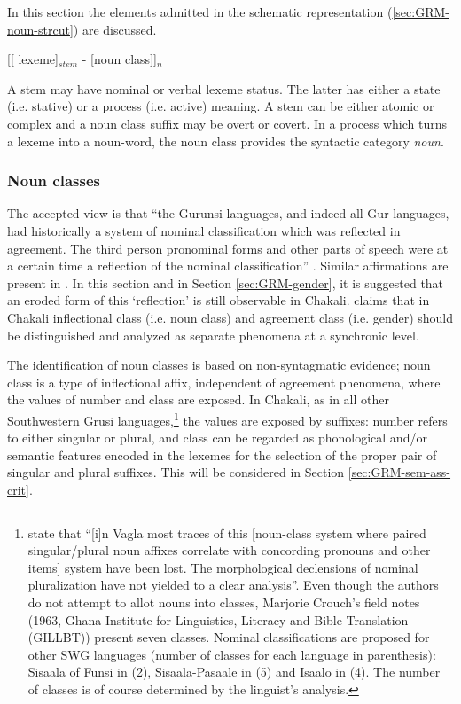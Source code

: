 \begin{exe}
\begin{exe}
\begin{exe}
{\begin{exe}
\begin{exe}
\begin{exe}
\begin{exe}
In this section the elements admitted in the
schematic representation (\ref{sec:GRM-noun-strcut}) are discussed.

\ea\label{sec:GRM-noun-strcut}
[[ {\sc lexeme}]$_{stem}$ - [{\sc noun class}]]$_{n}$
\z

A stem may have 
nominal or verbal lexeme status. The latter has either a state (i.e. stative) or
a process (i.e. active) meaning.  A stem can be either atomic or complex and a
noun class suffix may be overt or covert.  In a
 process which turns a lexeme into a noun-word,  the noun class provides the
syntactic category {\it noun}. 




\subsubsection{Noun classes}
\label{sec:GRM-noun-classes}

The accepted view is that ``the Gurunsi languages, and indeed all Gur languages,
had historically a system of nominal classification which was reflected in
agreement. The third person pronominal forms and other parts of speech were at a
certain time a reflection of the nominal classification''  \citep{Nade89}.
 Similar affirmations are present in \citet{Mane69b, Waa71, Nade82, Nade98,
Tcha07}.  In this section and in Section
\ref{sec:GRM-gender}, it is suggested that
an eroded form of this `reflection' is still observable in Chakali.
\citet{Brin07c} claims that in Chakali inflectional class
(i.e. noun class) and agreement class (i.e. gender) should be distinguished and
analyzed as separate phenomena at a synchronic level.

 The identification of noun classes is based on non-syntagmatic evidence; noun
class is a type of inflectional  affix, independent of agreement
phenomena, where the values of number
and class are exposed. In Chakali, as in all  other Southwestern Grusi  
languages,\footnote{\citet[136]{Nade98} state that ``[i]n
Vagla most traces
of this [noun-class system where paired singular/plural noun affixes correlate
with concording pronouns and other items] system have been lost. The
morphological declensions of nominal pluralization have not yielded to a clear
analysis''.  Even though the authors do not attempt to allot nouns into classes,
Marjorie Crouch's field notes (1963, Ghana Institute for Linguistics, Literacy
and Bible Translation (GILLBT)) present seven classes. Nominal classifications
are proposed for other SWG languages (number of classes for each language in
parenthesis): Sisaala of Funsi in \citet{Rowl66} (2), Sisaala-Pasaale in
\citet{Mcgi99} (5) and Isaalo in \citet{Mora06} (4).  The number of classes is 
of
course determined by the linguist's analysis.\label{foot:noun-class}}  the
values are exposed by
suffixes: number refers to either singular or plural, and class can be regarded
as phonological and/or semantic features encoded in the lexemes for the
selection
of the proper pair of singular and plural suffixes. This will be considered in
Section \ref{sec:GRM-sem-ass-crit}. 




\end{exe}
\end{exe}
\end{exe}
\end{exe}}
\end{exe}
\end{exe}
\end{exe}
